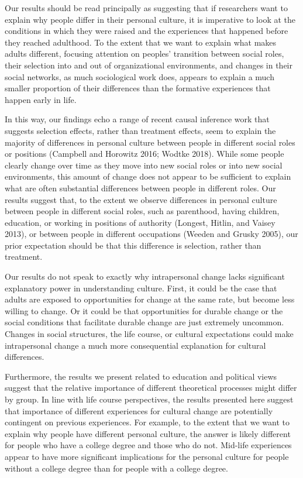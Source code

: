 \documentclass[
  11pt,
]{article}
\begin{document}
Our results should be read principally as suggesting that if researchers
want to explain why people differ in their personal culture, it is
imperative to look at the conditions in which they were raised and the
experiences that happened before they reached adulthood. To the extent
that we want to explain what makes adults different, focusing attention
on peoples' transition between social roles, their selection into and
out of organizational environments, and changes in their social
networks, as much sociological work does, appears to explain a much
smaller proportion of their differences than the formative experiences
that happen early in life.

In this way, our findings echo a range of recent causal inference work
that suggests selection effects, rather than treatment effects, seem to
explain the majority of differences in personal culture between people
in different social roles or positions (Campbell and Horowitz 2016;
Wodtke 2018). While some people clearly change over time as they move
into new social roles or into new social environments, this amount of
change does not appear to be sufficient to explain what are often
substantial differences between people in different roles. Our results
suggest that, to the extent we observe differences in personal culture
between people in different social roles, such as parenthood, having
children, education, or working in positions of authority (Longest,
Hitlin, and Vaisey 2013), or between people in different occupations
(Weeden and Grusky 2005), our prior expectation should be that this
difference is selection, rather than treatment.

Our results do not speak to exactly why intrapersonal change lacks
significant explanatory power in understanding culture. First, it could
be the case that adults are exposed to opportunities for change at the
same rate, but become less willing to change. Or it could be that
opportunities for durable change or the social conditions that
facilitate durable change are just extremely uncommon. Changes in social
structures, the life course, or cultural expectations could make
intrapersonal change a much more consequential explanation for cultural
differences.

Furthermore, the results we present related to education and political
views suggest that the relative importance of different theoretical
processes might differ by group. In line with life course perspectives,
the results presented here suggest that importance of different
experiences for cultural change are potentially contingent on previous
experiences. For example, to the extent that we want to explain why
people have different personal culture, the answer is likely different
for people who have a college degree and those who do not. Mid-life
experiences appear to have more significant implications for the
personal culture for people without a college degree than for people
with a college degree.
\end{document}
